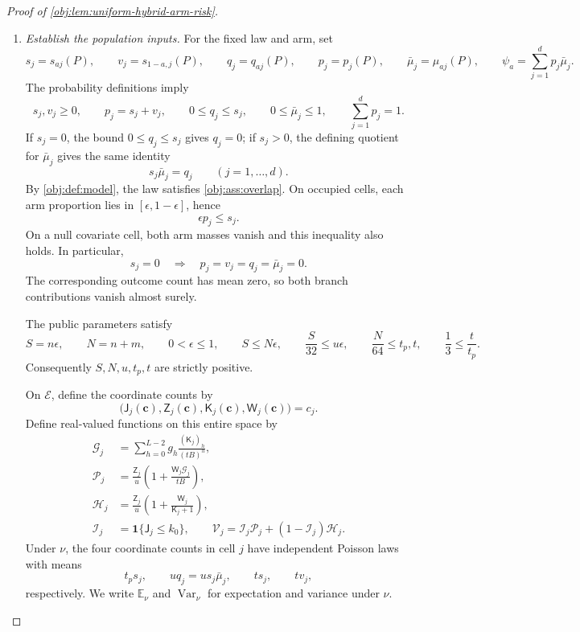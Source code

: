 \documentclass[11pt]{article}
\begin{document}
\begin{proof}[Proof of \cref{obj:lem:uniform-hybrid-arm-risk}]
\begin{enumerate}
\item \textit{Establish the population inputs.}
For the fixed law and arm, set
\begingroup\footnotesize
\[
s_j=s_{aj}(P),\qquad
v_j=s_{1-a,j}(P),\qquad
q_j=q_{aj}(P),\qquad
p_j=p_j(P),\qquad
\bar\mu_j=\mu_{aj}(P),
\qquad
\psi_a=\sum_{j=1}^dp_j\bar\mu_j.
\]
\endgroup
The probability definitions imply
\[
s_j,v_j\ge0,\qquad
p_j=s_j+v_j,\qquad
0\le q_j\le s_j,\qquad
0\le\bar\mu_j\le1,\qquad
\sum_{j=1}^dp_j=1.
\]
If \(s_j=0\), the bound \(0\le q_j\le s_j\) gives \(q_j=0\); if \(s_j>0\), the defining quotient for \(\bar\mu_j\) gives the same identity
\[
s_j\bar\mu_j=q_j
\qquad(j=1,\ldots,d).
\]
By \cref{obj:def:model}, the law satisfies \cref{obj:ass:overlap}. On occupied cells, each arm proportion lies in \([\epsilon,1-\epsilon]\), hence
\[
\epsilon p_j\le s_j.
\]
On a null covariate cell, both arm masses vanish and this inequality also holds. In particular,
\[
s_j=0\quad\Longrightarrow\quad
p_j=v_j=q_j=\bar\mu_j=0.
\]
The corresponding outcome count has mean zero, so both branch contributions vanish almost surely.

The public parameters satisfy
\begingroup\small
\[
S=n\epsilon,\qquad N=n+m,\qquad
0<\epsilon\le1,\qquad
S\le N\epsilon,\qquad
\frac S{32}\le u\epsilon,\qquad
\frac N{64}\le t_p,t,\qquad
\frac13\le\frac t{t_p}.
\]
\endgroup
Consequently \(S,N,u,t_p,t\) are strictly positive.

On \(\mathcal E\), define the coordinate counts by
\[
\bigl(\mathsf J_j(\boldsymbol c),\mathsf Z_j(\boldsymbol c),
\mathsf K_j(\boldsymbol c),\mathsf W_j(\boldsymbol c)\bigr)=c_j.
\]
Define real-valued functions on this entire space by
\[
\begin{aligned}
\mathcal G_j
&=\sum_{h=0}^{L-2}g_h\frac{(\mathsf K_j)_h}{(tB)^h},\\
\mathcal P_j
&=\frac{\mathsf Z_j}{u}
\left(1+\frac{\mathsf W_j\mathcal G_j}{tB}\right),\\
\mathcal H_j
&=\frac{\mathsf Z_j}{u}
\left(1+\frac{\mathsf W_j}{\mathsf K_j+1}\right),\\
\mathcal I_j&=\mathbf1\{\mathsf J_j\le k_0\},\qquad
\mathcal V_j=\mathcal I_j\mathcal P_j+(1-\mathcal I_j)\mathcal H_j.
\end{aligned}
\]
Under \(\nu\), the four coordinate counts in cell \(j\) have independent Poisson laws with means
\[
t_ps_j,\qquad uq_j=us_j\bar\mu_j,\qquad ts_j,\qquad tv_j,
\]
respectively. We write \(\mathbb E_\nu\) and \(\operatorname{Var}_\nu\) for expectation and variance under \(\nu\).


\end{enumerate}
\end{proof}
\end{document}
